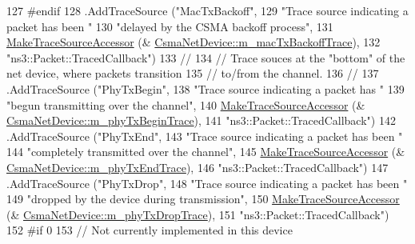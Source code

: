 \begin{DoxyCode}
127 \textcolor{preprocessor}{#endif}
128     .AddTraceSource (\textcolor{stringliteral}{"MacTxBackoff"}, 
129                      \textcolor{stringliteral}{"Trace source indicating a packet has been "}
130                      \textcolor{stringliteral}{"delayed by the CSMA backoff process"},
131                      \hyperlink{group__tracing_gab21a770b9855af4e8f69f7531ea4a6b0}{MakeTraceSourceAccessor} (&
      \hyperlink{classns3_1_1CsmaNetDevice_a1f035d24ccf03e5731243e0b22665cb0}{CsmaNetDevice::m\_macTxBackoffTrace}),
132                      \textcolor{stringliteral}{"ns3::Packet::TracedCallback"})
133     \textcolor{comment}{//}
134     \textcolor{comment}{// Trace souces at the "bottom" of the net device, where packets transition}
135     \textcolor{comment}{// to/from the channel.}
136     \textcolor{comment}{//}
137     .AddTraceSource (\textcolor{stringliteral}{"PhyTxBegin"}, 
138                      \textcolor{stringliteral}{"Trace source indicating a packet has "}
139                      \textcolor{stringliteral}{"begun transmitting over the channel"},
140                      \hyperlink{group__tracing_gab21a770b9855af4e8f69f7531ea4a6b0}{MakeTraceSourceAccessor} (&
      \hyperlink{classns3_1_1CsmaNetDevice_a6c5deac5e6a05a2013175402d4e22985}{CsmaNetDevice::m\_phyTxBeginTrace}),
141                      \textcolor{stringliteral}{"ns3::Packet::TracedCallback"})
142     .AddTraceSource (\textcolor{stringliteral}{"PhyTxEnd"}, 
143                      \textcolor{stringliteral}{"Trace source indicating a packet has been "}
144                      \textcolor{stringliteral}{"completely transmitted over the channel"},
145                      \hyperlink{group__tracing_gab21a770b9855af4e8f69f7531ea4a6b0}{MakeTraceSourceAccessor} (&
      \hyperlink{classns3_1_1CsmaNetDevice_a8cac1ff27eec4db589ed00545f942a21}{CsmaNetDevice::m\_phyTxEndTrace}),
146                      \textcolor{stringliteral}{"ns3::Packet::TracedCallback"})
147     .AddTraceSource (\textcolor{stringliteral}{"PhyTxDrop"}, 
148                      \textcolor{stringliteral}{"Trace source indicating a packet has been "}
149                      \textcolor{stringliteral}{"dropped by the device during transmission"},
150                      \hyperlink{group__tracing_gab21a770b9855af4e8f69f7531ea4a6b0}{MakeTraceSourceAccessor} (&
      \hyperlink{classns3_1_1CsmaNetDevice_ad2a07cf80f83d9ce17d9280775e9a1f8}{CsmaNetDevice::m\_phyTxDropTrace}),
151                      \textcolor{stringliteral}{"ns3::Packet::TracedCallback"})
152 \textcolor{preprocessor}{#if 0}
153     \textcolor{comment}{// Not currently implemented in this device}

\end{DoxyCode}
